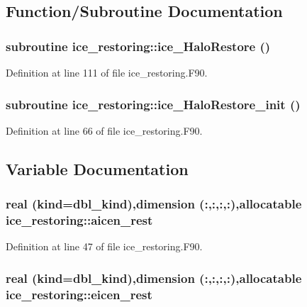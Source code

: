 \subsection{Function/Subroutine Documentation}
\hypertarget{namespaceice__restoring_a49df88e98add45cf36562220985fea56}{
\subsubsection[{ice\_\-HaloRestore}]{\setlength{\rightskip}{0pt plus 5cm}subroutine ice\_\-restoring::ice\_\-HaloRestore ()}}
\label{namespaceice__restoring_a49df88e98add45cf36562220985fea56}


Definition at line 111 of file ice\_\-restoring.F90.\hypertarget{namespaceice__restoring_a5abeabb1c3d2382c18bedd81914b9b60}{
\subsubsection[{ice\_\-HaloRestore\_\-init}]{\setlength{\rightskip}{0pt plus 5cm}subroutine ice\_\-restoring::ice\_\-HaloRestore\_\-init ()}}
\label{namespaceice__restoring_a5abeabb1c3d2382c18bedd81914b9b60}


Definition at line 66 of file ice\_\-restoring.F90.

\subsection{Variable Documentation}
\hypertarget{namespaceice__restoring_a1e0ef4f98814f59a3331155876b9a23f}{
\subsubsection[{aicen\_\-rest}]{\setlength{\rightskip}{0pt plus 5cm}real (kind=dbl\_\-kind),dimension (:,:,:,:),allocatable {\bf ice\_\-restoring::aicen\_\-rest}}}
\label{namespaceice__restoring_a1e0ef4f98814f59a3331155876b9a23f}


Definition at line 47 of file ice\_\-restoring.F90.\hypertarget{namespaceice__restoring_a355c3e0f0ff976375ef772137ca2fb89}{
\subsubsection[{eicen\_\-rest}]{\setlength{\rightskip}{0pt plus 5cm}real (kind=dbl\_\-kind),dimension (:,:,:,:),allocatable {\bf ice\_\-restoring::eicen\_\-rest}}}
\label{namespaceice__restoring_a355c3e0f0ff976375ef772137ca2fb89}


